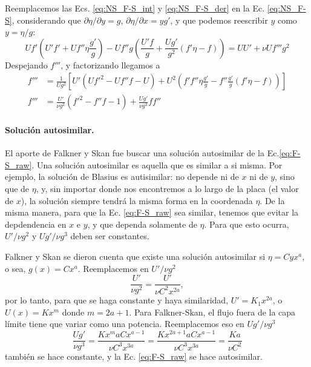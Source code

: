 Reemplacemos las Ecs. \eqref{eq:NS_F-S_int} y \eqref{eq:NS_F-S_der} en la Ec. \eqref{eq:NS_F-S}, considerando que $\partial\eta/\partial y=g$, $\partial\eta/\partial x = yg'$, y que podemos reescribir $y$ como $y=\eta/g$:
%
\begin{equation}
Uf'(U'f'+Uf''\eta\frac{g'}{g})-Uf''g\left(\frac{U'f}{g}+\frac{Ug'}{g^2}(f'\eta-f)\right) = UU'+\nu Uf'''g^2
\end{equation}
%
Despejando $f'''$, y factorizando llegamos a
%
\begin{align}\label{eq:F-S_raw}
f'''&=\frac{1}{Ug^2}\left[U'(Uf'^2-Uf''f-U)+U^2\left(f'f''\eta\frac{g'}{g} - f''\frac{g'}{g}(f'\eta-f)\right)\right] \nonumber\\
f'''&=\frac{U'}{\nu g^2}(f'^2-f''f-1)+\frac{Ug'}{\nu g^3}ff''
\end{align}

\paragraph*{Solución autosimilar.}
El aporte de Falkner y Skan fue buscar una solución autosimilar de la Ec.\eqref{eq:F-S_raw}.
Una solución autosimilar es aquella que es similar a si misma.
Por ejemplo, la solución de Blasius es autisimilar: no depende ni de $x$ ni de $y$, sino que de $\eta$, y, sin importar donde nos encontremos a lo largo de la placa (el valor de $x$), la solución siempre tendrá la misma forma en la coordenada $\eta$.
De la misma manera, para que la Ec. \eqref{eq:F-S_raw} sea similar, tenemos que evitar la depdendencia en $x$ e $y$, y que dependa solamente de $\eta$.
Para que esto ocurra, $U'/\nu g^2$ y $Ug'/\nu g^3$ deben ser constantes.

Falkner y Skan se dieron cuenta que existe una solución autosimilar si $\eta=Cyx^a$, o sea, $g(x)=Cx^a$. 
Reemplacemos en $U'/\nu g^2$
%
\begin{equation}
\frac{U'}{\nu g^2} = \frac{U'}{\nu C^2x^{2a}},
\end{equation}
%
por lo tanto, para que se haga constante y haya similaridad, $U'=K_1x^{2a}$, o $U(x)=Kx^m$ donde $m=2a+1$.
Para Falkner-Skan, el flujo fuera de la capa límite tiene que variar como una potencia.
Reemplacemos eso en $Ug'/\nu g^3$
%
\begin{equation}
\frac{Ug'}{\nu g^3}=\frac{Kx^maCx^{a-1}}{\nu C^3x^{3a}} = \frac{Kx^{2a+1}aCx^{a-1}}{\nu C^3x^{3a}} = \frac{Ka}{\nu C^2}
\end{equation}
%
también se hace constante, y la Ec. \eqref{eq:F-S_raw} se hace autosimilar.

